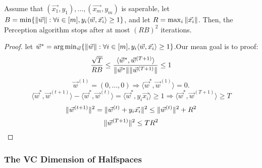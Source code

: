 \begin{thm}
	Assume that $(\vec{x_1},y_1), \dots,(\vec{x_m},y_m)$ is saperable,
	let $B=\min \{ \Arrowvert \vec{w} \Arrowvert : \forall i \in [m], 
		y_i \langle \vec{w}, \vec{x_i} \rangle \ge 1 \}$,
	and let $R = \max_i \Arrowvert \vec{x_i} \Arrowvert$.
	Then, the Perception algorithm stops after at most $(RB)^2$ iterations.
\end{thm}
\begin{proof}
	let $\vec{w}^*=\arg\min_{\vec{w}} \{ \Arrowvert \vec{w} \Arrowvert : \forall i \in [m], 
		y_i \langle \vec{w}, \vec{x_i} \rangle \ge 1 \}$.Our mean goal is to proof:
	\begin{equation}
		\frac{\sqrt{T}}{RB} \le 
		\frac{ \langle \vec{w}^*, \vec{w}^{(T+1)} \rangle}
		{\Arrowvert \vec{w}^* \Arrowvert \Arrowvert \vec{w}^{(T+1)} \Arrowvert}		
		\le 1
	\end{equation}
	\[
		\vec{w}^{(1)} = (0, \dots, 0) \Rightarrow \langle \vec{w}^*, \vec{w}^{(1)} \rangle = 0
	.\]
	\begin{equation}
		\langle \vec{w}^*, \vec{w}^{(t+1)} \rangle
		- \langle \vec{w}^*, \vec{w}^{(t)} \rangle
		= \langle \vec{w}^*, y_i \vec{x_i} \rangle \ge 1
		\Rightarrow
		\langle \vec{w}^*, \vec{w}^{(T+1)} \rangle \ge T
	\end{equation}
	\begin{equation}
			\Arrowvert \vec{w}^{(t+1)} \Arrowvert^2
			= \Arrowvert \vec{w}^{(t)} + y_i \vec{x_i} \Arrowvert ^2
			\le \Arrowvert \vec{w}^{(t)} \Arrowvert ^2 + R^2
	\end{equation}
	\begin{equation}
		\Arrowvert \vec{w}^{(T+1)} \Arrowvert^2 \le TR^2 
	\end{equation}	
\end{proof}

\subsubsection {The VC Dimension of Halfspaces}

